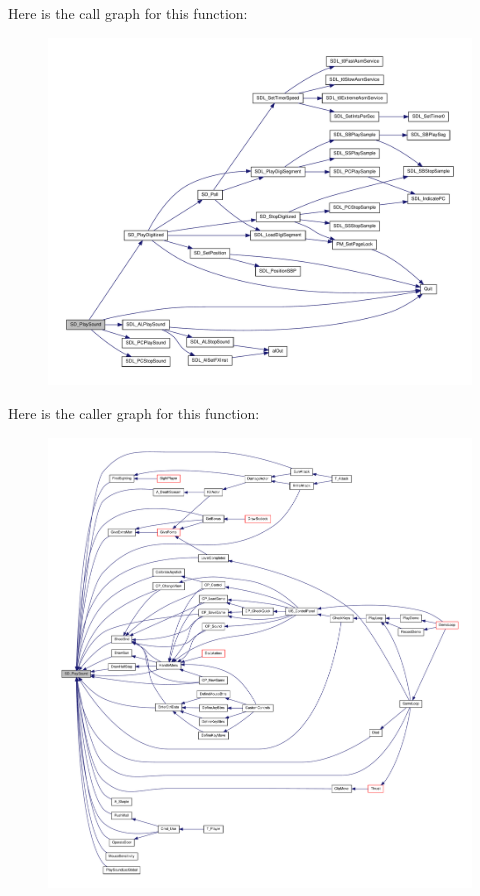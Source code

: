 Here is the call graph for this function:
\nopagebreak
\begin{figure}[H]
\begin{center}
\leavevmode
\includegraphics[width=400pt]{ID__SD_8C_af6a678e2015e6474a341bbd8ab03c12f_cgraph}
\end{center}
\end{figure}




Here is the caller graph for this function:
\nopagebreak
\begin{figure}[H]
\begin{center}
\leavevmode
\includegraphics[width=400pt]{ID__SD_8C_af6a678e2015e6474a341bbd8ab03c12f_icgraph}
\end{center}
\end{figure}


